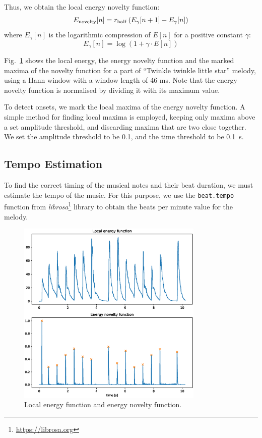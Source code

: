 \documentclass[conference]{IEEEtran}
\begin{document}
Thus, we obtain the local energy novelty function:
\begin{displaymath}
E_{\rm{novelty}}[n]=r_{\rm{half}} \left(E_{\gamma}[n+1]-E_{\gamma}[n] \right) 
\end{displaymath}
where $E_{\gamma}[n]$ is the logarithmic compression of $E[n]$ for a positive constant $\gamma$:
\begin{displaymath}
E_{\gamma}[n] = \log \left( 1 + \gamma \cdot E[n] \right) 
\end{displaymath}

Fig.~\ref{fig_onset} shows the local energy, the energy novelty function and the marked maxima of the novelty function for a part of ``Twinkle twinkle little star'' melody, using a Hann window with a window length of 46 ms.
Note that the energy novelty function is normalised by dividing it with its maximum value.

To detect onsets, we mark the local maxima of the energy novelty function.
A simple method for finding local maxima is employed, keeping only maxima above a set amplitude threshold, and discarding maxima that are two close together. 
We set the amplitude threshold to be 0.1, and the time threshold to be 0.1~s.

\subsection{Tempo Estimation}

To find the correct timing of the musical notes and their beat duration, we must estimate the tempo of the music.
For this purpose, we use the \texttt{beat.tempo} function from \emph{librosa}\footnote{\url{https://librosa.org}} library \cite{LIBROSA} to obtain the beats per minute value for the melody. 

\begin{figure}[bt]
\centering
\vspace{-10pt}
\includegraphics[clip, width=3.5in]{onset}
\caption{Local energy function and energy novelty function.}
\label{fig_onset}
\vspace{-2pt}
\end{figure}
\end{document}

